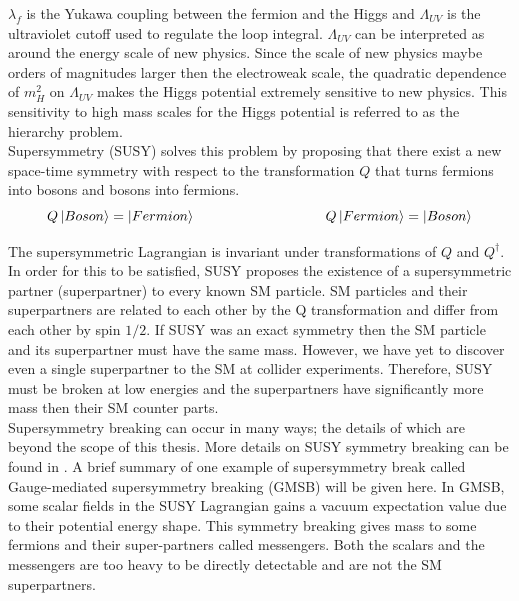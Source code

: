 \indent $\lambda_f$ is the Yukawa coupling between the fermion and the Higgs and $\Lambda_{UV}$ is the ultraviolet cutoff used to regulate the loop integral.  $\Lambda_{UV}$ can be interpreted as around the energy scale of new physics.  Since the scale of new physics maybe orders of magnitudes larger then the electroweak scale, the quadratic dependence of $m_H^2$ on $\Lambda_{UV}$ makes the Higgs potential extremely sensitive to new physics. This sensitivity to high mass scales for the Higgs potential is referred to as the hierarchy problem.  \\ %

\indent Supersymmetry (SUSY) solves this problem by proposing that there exist a new space-time symmetry with respect to the transformation $Q$ that turns fermions into bosons and bosons into fermions.\\

\begin{equation}
\label{eqn:Higgs:Loopf}
Q\ket{Boson} = \ket{Fermion} ~~~~~~~~~~~~~~~~~~~~~~~~~~~~ Q\ket{Fermion} = \ket{Boson}
\end{equation}

\indent The supersymmetric Lagrangian is invariant under transformations of $Q$ and $Q^{\dagger}$.  In order for this to be satisfied, SUSY proposes the existence of a supersymmetric partner (superpartner) to every known SM particle.  SM particles and their superpartners are related to each other by the Q transformation and differ from each other by spin $1/2$.  If SUSY was an exact symmetry then the SM particle and its superpartner must have the same mass.  However, we have yet to discover even a single superpartner to the SM at collider experiments.  Therefore, SUSY must be broken at low energies and the superpartners have significantly more mass then their SM counter parts.  \\

\indent Supersymmetry breaking can occur in many ways; the details of which are beyond the scope of this thesis.  More details on SUSY symmetry breaking can be found in \cite{MartinSUSY}.  A brief summary of one example of supersymmetry break called Gauge-mediated supersymmetry breaking (GMSB) will be given here.   In GMSB, some scalar fields in the SUSY Lagrangian gains a vacuum expectation value due to their potential energy shape.  This symmetry breaking gives mass to some fermions and their super-partners called messengers.  Both the scalars and the messengers are too heavy to be directly detectable and are not the SM superpartners.  \\

